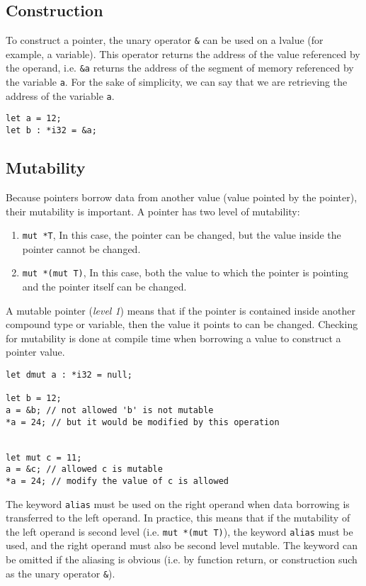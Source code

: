 \subsection {Construction}

To construct a pointer, the unary operator \texttt{\&} can be used on a lvalue
(for example, a variable). This operator returns the address of the value
referenced by the operand, i.e. \texttt{\&a} returns the address of the segment
of memory referenced by the variable \texttt{a}. For the sake of simplicity, we
can say that we are retrieving the address of the variable \texttt{a}.

\begin{lstlisting}[style=coloredverbatim]
let a = 12;
let b : *i32 = &a;
\end{lstlisting}

\subsection {Mutability}

Because pointers borrow data from another value (value pointed by the pointer),
their mutability is important. A pointer has two level of mutability:
\begin{enumerate}
\item \texttt{mut *T}, In this case, the pointer can be changed, but the value
  inside the pointer cannot be changed.
\item \texttt{mut *(mut T)}, In this case, both the value to which the pointer
  is pointing and the pointer itself can be changed.
\end{enumerate}

A mutable pointer (\textit{level 1}) means that if the pointer is contained
inside another compound type or variable, then the value it points to can be
changed. Checking for mutability is done at compile time when borrowing a value
to construct a pointer value.
\smallskip

\begin{lstlisting}[style=coloredverbatim]
let dmut a : *i32 = null;

let b = 12;
a = &b; // not allowed 'b' is not mutable
*a = 24; // but it would be modified by this operation


let mut c = 11;
a = &c; // allowed c is mutable
*a = 24; // modify the value of c is allowed
\end{lstlisting}

\smallskip
The keyword \texttt{alias} must be used on the right operand when data borrowing
is transferred to the left operand. In practice, this means that if the
mutability of the left operand is second level (i.e. \texttt{mut *(mut T)}), the
keyword \texttt{alias} must be used, and the right operand must also be second
level mutable. The keyword can be omitted if the aliasing is obvious (i.e. by
function return, or construction such as the unary operator \texttt{\&}).

